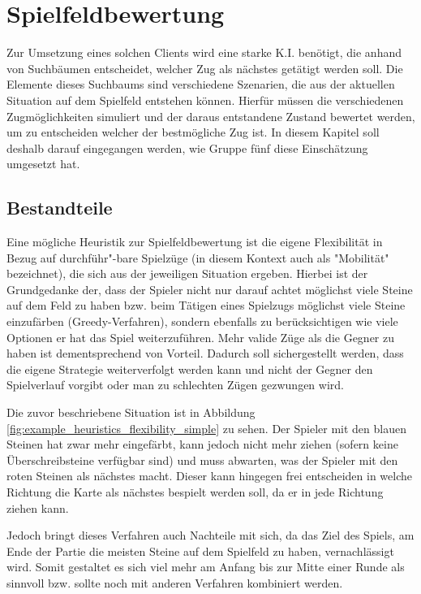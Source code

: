 \documentclass[12pt,a4paper,bibliography=totocnumbered,listof=totocnumbered]{article}
\begin{document}
\section{Spielfeldbewertung}
Zur Umsetzung eines solchen Clients wird eine starke K.I. benötigt, die anhand von Suchbäumen entscheidet, welcher Zug als nächstes getätigt werden soll. Die Elemente dieses Suchbaums sind verschiedene Szenarien, die aus der aktuellen Situation auf dem Spielfeld entstehen können. Hierfür müssen die verschiedenen Zugmöglichkeiten simuliert und der daraus entstandene Zustand bewertet werden, um zu entscheiden welcher der bestmögliche Zug ist. 
In diesem Kapitel soll deshalb darauf eingegangen werden, wie Gruppe fünf diese Einschätzung umgesetzt hat.

\subsection{Bestandteile}\label{kap:Heuristik_Beschreibung}
Eine mögliche Heuristik zur Spielfeldbewertung ist die eigene Flexibilität in Bezug auf durchführ"-bare Spielzüge (in diesem Kontext auch als "Mobilität" bezeichnet), die sich aus der jeweiligen Situation ergeben. Hierbei ist der Grundgedanke der, dass der Spieler nicht nur darauf achtet möglichst viele Steine auf dem Feld zu haben bzw. beim Tätigen eines Spielzugs möglichst viele Steine einzufärben (Greedy-Verfahren), sondern ebenfalls zu berücksichtigen wie viele Optionen er hat das Spiel weiterzuführen. Mehr valide Züge als die Gegner zu haben ist dementsprechend von Vorteil. Dadurch soll sichergestellt werden, dass die eigene Strategie weiterverfolgt werden kann und nicht der Gegner den Spielverlauf vorgibt oder man zu \glqq schlechten\grqq{} Zügen gezwungen wird.

Die zuvor beschriebene Situation ist in Abbildung \ref{fig:example_heuristics_flexibility_simple} zu sehen. Der Spieler mit den blauen Steinen hat zwar mehr eingefärbt, kann jedoch nicht mehr ziehen (sofern keine Überschreibsteine verfügbar sind) und muss abwarten, was der Spieler mit den roten Steinen als nächstes macht. Dieser kann hingegen frei entscheiden in welche Richtung die Karte als nächstes bespielt werden soll, da er in jede Richtung ziehen kann.

Jedoch bringt dieses Verfahren auch Nachteile mit sich, da das Ziel des Spiels, am Ende der Partie die meisten Steine auf dem Spielfeld zu haben, vernachlässigt wird. Somit gestaltet es sich viel mehr am Anfang bis zur Mitte einer Runde als sinnvoll bzw. sollte noch mit anderen Verfahren kombiniert werden.
\end{document}
